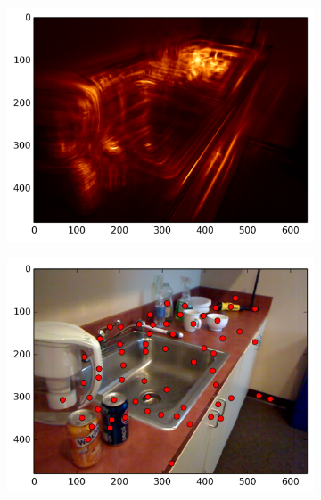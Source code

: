 \begin{figure}[ht]
\begin{subfigure}[]{0.25\linewidth}\label{fig:kit_smag_4}\includegraphics[width=\linewidth]{figures/kitchen_smag_9}\end{subfigure}%
\begin{subfigure}[]{0.25\linewidth}\label{fig:kit_feats_4}\includegraphics[width=\linewidth]{figures/kitchen_feats_9}\end{subfigure}%

\end{figure}
